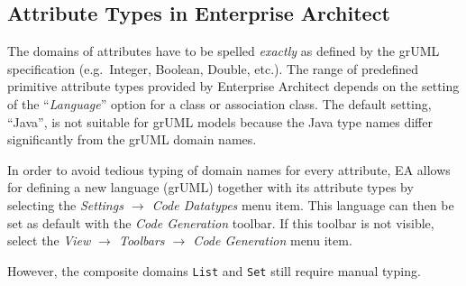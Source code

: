 \documentclass[a4paper]{article}
\begin{document}
	\subsection{Attribute Types in Enterprise Architect}
	The domains of attributes have to be spelled \emph{exactly} as defined by the grUML specification (e.g.\ Integer, Boolean, Double, etc.). The range of predefined primitive attribute types provided by Enterprise Architect depends on the setting of the ``\emph{Language}'' option for a class or association class. The default setting, ``Java'', is not suitable for grUML models because the Java type names differ significantly from the grUML domain names. 

	In order to avoid tedious typing of domain names for every attribute, EA allows for defining a new language (grUML) together with its attribute types by selecting the \emph{Settings $\rightarrow$ Code Datatypes} menu item. This language can then be set as default with the \emph{Code Generation} toolbar. If this toolbar is not visible, select the \emph{View $\rightarrow$ Toolbars $\rightarrow$ Code Generation} menu item.
	
	However, the composite domains \texttt{List} and \texttt{Set} still require manual typing.
	
\end{document}
